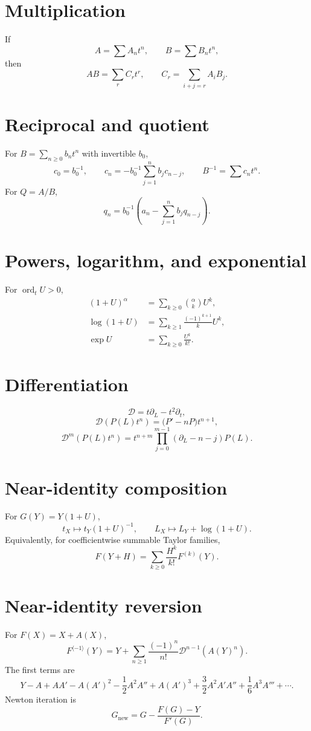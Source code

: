 \documentclass[11pt,oneside]{book}
\theoremstyle{definition}
\theoremstyle{remark}
\DeclareMathOperator{\ord}{ord}
\newcommand{\D}{\mathcal D}
\newcommand{\compinv}{^{\langle-1\rangle}}
\begin{document}
\section*{Multiplication}
If
\[
 A=\sum A_nt^n,\qquad B=\sum B_nt^n,
\]
then
\[
 AB=\sum_rC_rt^r,\qquad
 C_r=\sum_{i+j=r}A_iB_j.
\]

\section*{Reciprocal and quotient}
For $B=\sum_{n\ge0}b_nt^n$ with invertible $b_0$,
\[
 c_0=b_0^{-1},\qquad
 c_n=-b_0^{-1}\sum_{j=1}^nb_jc_{n-j},
 \qquad B^{-1}=\sum c_nt^n.
\]
For $Q=A/B$,
\[
 q_n=b_0^{-1}\left(a_n-\sum_{j=1}^nb_jq_{n-j}\right).
\]

\section*{Powers, logarithm, and exponential}
For $\ord_tU>0$,
\begin{align*}
 (1+U)^\alpha&=\sum_{k\ge0}\binom{\alpha}{k}U^k,\\
 \log(1+U)&=\sum_{k\ge1}\frac{(-1)^{k+1}}{k}U^k,\\
 \exp U&=\sum_{k\ge0}\frac{U^k}{k!}.
\end{align*}

\section*{Differentiation}
\[
 \D=t\partial_L-t^2\partial_t,
\]
\[
 \D(P(L)t^n)=\bigl(P'-nP\bigr)t^{n+1},
\]
\[
 \D^m(P(L)t^n)
 =t^{n+m}\prod_{j=0}^{m-1}(\partial_L-n-j)P(L).
\]

\section*{Near-identity composition}
For $G(Y)=Y(1+U)$,
\[
 t_X\mapsto t_Y(1+U)^{-1},
 \qquad
 L_X\mapsto L_Y+\log(1+U).
\]
Equivalently, for coefficientwise summable Taylor families,
\[
 F(Y+H)=\sum_{k\ge0}\frac{H^k}{k!}F^{(k)}(Y).
\]

\section*{Near-identity reversion}
For $F(X)=X+A(X)$,
\begin{equation}\label{eq:quick-LB}
 F\compinv(Y)
 =Y+\sum_{n\ge1}\frac{(-1)^n}{n!}
   \D^{n-1}\!\left(A(Y)^n\right).
\end{equation}
The first terms are
\[
 Y-A+AA'
 -A(A')^2-\frac12A^2A''
 +A(A')^3+\frac32A^2A'A''
 +\frac16A^3A'''+\cdots.
\]
Newton iteration is
\[
 G_{\mathrm{new}}
 =G-\frac{F(G)-Y}{F'(G)}.
\]
\end{document}
